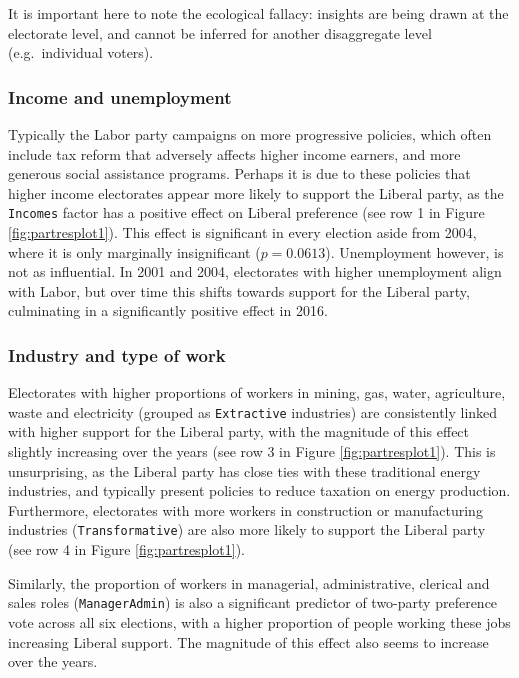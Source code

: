 \documentclass[11pt,a4paper,]{article}
\begin{document}
It is important here to note the ecological fallacy: insights are being drawn at the electorate level, and cannot be inferred for another disaggregate level (e.g.~individual voters).

\hypertarget{income-and-unemployment}{%
\subsubsection{Income and unemployment}\label{income-and-unemployment}}

Typically the Labor party campaigns on more progressive policies, which often include tax reform that adversely affects higher income earners, and more generous social assistance programs. Perhaps it is due to these policies that higher income electorates appear more likely to support the Liberal party, as the \texttt{Incomes} factor has a positive effect on Liberal preference (see row 1 in Figure \ref{fig:partresplot1}). This effect is significant in every election aside from 2004, where it is only marginally insignificant (\(p = 0.0613\)). Unemployment however, is not as influential. In 2001 and 2004, electorates with higher unemployment align with Labor, but over time this shifts towards support for the Liberal party, culminating in a significantly positive effect in 2016.

\hypertarget{industry-and-type-of-work}{%
\subsubsection{Industry and type of work}\label{industry-and-type-of-work}}

Electorates with higher proportions of workers in mining, gas, water, agriculture, waste and electricity (grouped as \texttt{Extractive} industries) are consistently linked with higher support for the Liberal party, with the magnitude of this effect slightly increasing over the years (see row 3 in Figure \ref{fig:partresplot1}). This is unsurprising, as the Liberal party has close ties with these traditional energy industries, and typically present policies to reduce taxation on energy production. Furthermore, electorates with more workers in construction or manufacturing industries (\texttt{Transformative}) are also more likely to support the Liberal party (see row 4 in Figure \ref{fig:partresplot1}).

Similarly, the proportion of workers in managerial, administrative, clerical and sales roles (\texttt{ManagerAdmin}) is also a significant predictor of two-party preference vote across all six elections, with a higher proportion of people working these jobs increasing Liberal support. The magnitude of this effect also seems to increase over the years.
\end{document}
